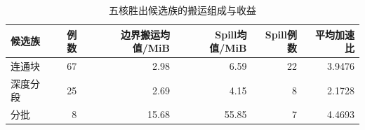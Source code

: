 \begin{table}[htbp]\centering
\caption{五核胜出候选族的搬运组成与收益}\label{tab:q2-family-crosscheck}
\small\begin{tabular}{lrrrrr}\toprule
候选族 & 例数 & 边界搬运均值/MiB & Spill均值/MiB & Spill例数 & 平均加速比 \\ \midrule
连通块 & 67 & 2.98 & 6.59 & 22 & 3.9476 \\
深度分段 & 25 & 2.69 & 4.15 & 8 & 2.1728 \\
分批 & 8 & 15.68 & 55.85 & 7 & 4.4693 \\
\bottomrule\end{tabular}\end{table}
